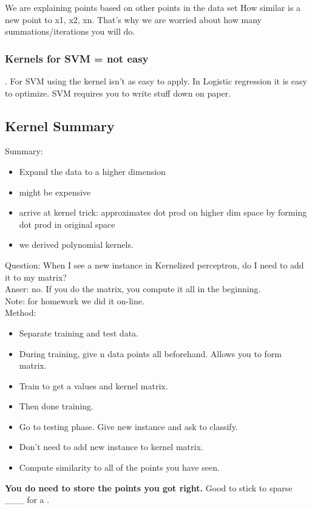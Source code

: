 We are explaining points based on other points in the data set
How similar is a new point to x1, x2, xn. 
That's why we are worried about how many summations/iterations you will do. 

\subsubsection{Kernels for SVM = not easy}.
For SVM using the kernel isn't as easy to apply.  In Logistic regression it is easy to optimize. 
    SVM requires you to write stuff down on paper. 
    
\subsection{Kernel Summary}
Summary: 
\begin{itemize}
    \item Expand the data to a higher dimension
    \item might be expensive
    \item arrive at kernel trick: approximates dot prod on higher dim space by forming dot prod in original space
    \item we derived polynomial kernels.
\end{itemize}
 
Question: When I see a new instance in Kernelized perceptron, do I need to add it to my matrix?   \hfill \\
Anser: no.  If you do the matrix, you compute it all in the beginning.   \hfill \\
Note: for homework we did it on-line.  \hfill \\

Method:
\begin{itemize}
        \item Separate training and test data.  
        \item During training, give n data points all beforehand.  Allows you to form matrix. 
        \item Train to get a values and kernel matrix. 
        \item Then done training.  
        \item Go to testing phase.  Give new instance and ask to classify.
        \item Don't need to add new instance to kernel matrix.  
        \item Compute similarity to all of the points you have seen. 
\end{itemize}

\textbf{You do need to store the points you got right.}
Good to stick to sparse \_\_\_ for a . 



